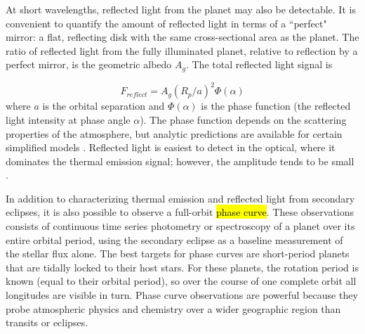\documentclass[graybox,natbib,nosecnum]{svmult}
\newcommand{\hbindex}[1]{\hl{#1}\index{#1}}  %
\begin{document}
At short wavelengths, reflected light from the planet may also be detectable. It is convenient to quantify the amount of reflected light in terms of a ``perfect" mirror: a flat, reflecting disk with the same cross-sectional area as the planet. The ratio of reflected light from the fully illuminated planet, relative to reflection by a perfect mirror, is the geometric albedo $A_g$. The total reflected light signal is

\begin{equation}
F_{reflect} = A_g(R_p/a)^2 \Phi(\alpha)
\end{equation}
where $a$ is the orbital separation and $\Phi(\alpha)$ is the phase function (the reflected light intensity at phase angle $\alpha$). The phase function depends on the scattering properties of the atmosphere, but analytic predictions are available for certain simplified models \citep[e.g.][]{madhu12}.  Reflected light is easiest to detect in the optical, where it dominates the thermal emission signal; however, the amplitude tends to be small \citep[typically less than 100 ppm;][]{angerhausen15}.

In addition to characterizing thermal emission and reflected light from secondary eclipses, it is also possible to observe a full-orbit \hbindex{phase curve}. These observations consists of continuous time series photometry or spectroscopy of a planet over its entire orbital period, using the secondary eclipse as a baseline measurement of the stellar flux alone.  The best targets for phase curves are short-period planets that are tidally locked to their host stars. For these planets, the rotation period is known (equal to their orbital period), so over the course of one complete orbit all longitudes are visible in turn.  Phase curve observations are powerful because they probe atmospheric physics and chemistry over a wider geographic region than transits or eclipses. %
\end{document}
